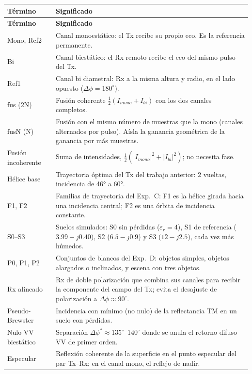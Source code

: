 \begin{longtable}{@{}L{2.8cm}L{11.6cm}@{}}
\toprule
\textbf{Término} & \textbf{Significado} \\
\midrule
\endfirsthead
\toprule
\textbf{Término} & \textbf{Significado} \\
\midrule
\endhead
Mono, Ref2 & Canal monoestático: el Tx recibe su propio eco. Es la referencia permanente. \\
Bi & Canal biestático: el Rx remoto recibe el eco del mismo pulso del Tx. \\
Ref1 & Canal bi diametral: Rx a la misma altura y radio, en el lado opuesto ($\Delta\phi=180^{\circ}$). \\
fus (2N) & Fusión coherente $\tfrac12(I_{mono}+I_{bi})$ con los dos canales completos. \\
fusN (N) & Fusión con el mismo número de muestras que la mono (canales alternados por pulso).
           Aísla la ganancia geométrica de la ganancia por más muestras. \\
Fusión incoherente & Suma de intensidades, $\tfrac12(|I_{mono}|^2+|I_{bi}|^2)$; no necesita fase. \\
Hélice base & Trayectoria óptima del Tx del trabajo anterior: 2 vueltas, incidencia de 46° a 60°. \\
F1, F2 & Familias de trayectoria del Exp.~C: F1 es la hélice girada hacia una incidencia central;
         F2 es una órbita de incidencia constante. \\
S0--S3 & Suelos simulados: S0 sin pérdidas ($\varepsilon_r=4$), S1 de referencia
         ($3.99-j0.40$), S2 ($6.5-j0.9$) y S3 ($12-j2.5$), cada vez más húmedos. \\
P0, P1, P2 & Conjuntos de blancos del Exp.~D: objetos simples, objetos alargados o inclinados, y
             escena con tres objetos. \\
Rx alineado & Rx de doble polarización que combina sus canales para recibir la componente del
              campo del Tx; evita el desajuste de polarización a $\Delta\phi\approx90^{\circ}$. \\
Pseudo-Brewster & Incidencia con mínimo (no nulo) de la reflectancia TM en un suelo con pérdidas. \\
Nulo VV biestático & Separación $\Delta\phi^\ast\approx135^{\circ}$--$140^{\circ}$ donde se anula el retorno
                     difuso VV de primer orden. \\
Especular & Reflexión coherente de la superficie en el punto especular del par Tx--Rx; en el
            canal mono, el reflejo de nadir. \\

\end{longtable}
